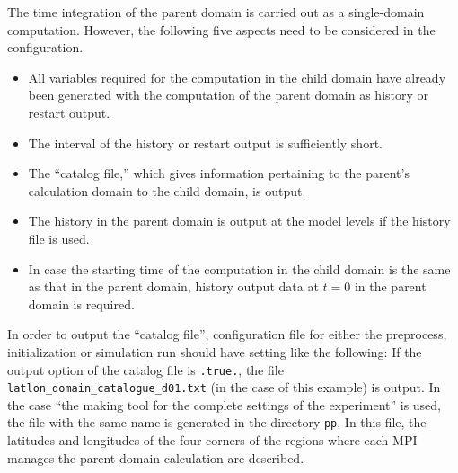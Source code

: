 The time integration of the parent domain is carried out as a single-domain computation.
However, the following five aspects need to be considered in the configuration.
\begin{itemize}
 \item All variables required for the computation in the child domain have already been generated with the computation of the parent domain as history or restart output.
 \item The interval of the history or restart output is sufficiently short.
 \item The ``catalog file,'' which gives information pertaining to the parent’s calculation domain
   to the child domain, is output.
 \item The history in the parent domain is output at the model levels if the history file is used.
 \item In case the starting time of the computation in the child domain is the same as that in the parent domain,
 history output data at $t=0$ in the parent domain is required.
\end{itemize}

In order to output the ``catalog file'', configuration file for either the preprocess, initialization or simulation run should have setting like the following:
If the output option of the catalog file is \verb|.true.|, the file \verb|latlon_domain_catalogue_d01.txt| (in the case of this example) is output.
In the case ``the making tool for the complete settings of the experiment'' is used, the file with the same name is generated in the directory \verb|pp|.
In this file, the latitudes and longitudes of the four corners of the regions where each MPI manages the parent domain calculation are described.

